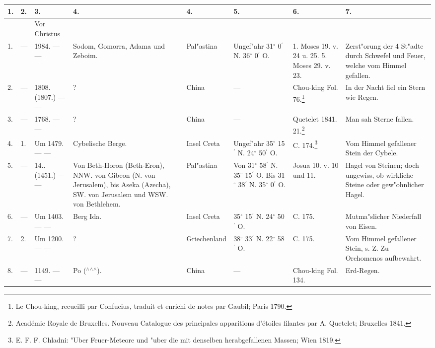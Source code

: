 \documentclass[a4paper, 8pt, oneside, polutonikogreek, german]{article}
\begin{document}
\begin{center}
    \footnotesize
    \begin{longtable}{| p{4mm} | p{2mm} | p{15mm} | p{25mm} | p{16mm} | p{12mm} | p{13mm} | p{20mm} |}
    \hline
        1. & 2. & 3. & 4. & 4. & 5. & 6. & 7. \\ \hline
          &   & Vor Christus &   &   &   &   &   \\ \hline
        1. & --- & 1984. --- --- & Sodom, Gomorra, Adama und Zeboim. & Pal"astina & Ungef"ahr 31$^\circ$ 0$^\prime$ N. 36$^\circ$ 0$^\prime$ O. & 1. Moses 19. v. 24 u. 25. 5. Moses 29. v. 23. & Zerst"orung der 4 St"adte durch Schwefel und Feuer, welche vom Himmel gefallen. \\ \hline
        2. & --- & 1808. (1807.) --- --- & ? & China & --- & Chou-king Fol. 76.\footnote{Le Chou-king, recueilli par Confucius, traduit et enrichi de notes par Gaubil; Paris 1790.} & In der Nacht fiel ein Stern wie Regen. \\ \hline
        3. & --- & 1768. --- --- & ? & China & --- & Quetelet 1841. 21.\footnote{Académie Royale de Bruxelles. Nouveau Catalogue des principales apparitions d'étoiles filantes par A. Quetelet; Bruxelles 1841.} & Man sah Sterne fallen. \\ \hline
        4. & 1. & Um 1479. --- --- & Cybelische Berge. & Insel Creta & Ungef"ahr 35$^\circ$ 15$^\prime$ N. 24$^\circ$ 50$^\prime$ O. & C. 174.\footnote{E. F. F. Chladni: "Uber Feuer-Meteore und "uber die mit denselben herabgefallenen Massen; Wien 1819.} & Vom Himmel gefallener Stein der Cybele. \\ \hline
        5. & --- & 14.. (1451.) --- --- & Von Beth-Horon (Beth-Eron), NNW. von Gibeon (N. von Jerusalem), bis Aseka (Azecha), SW. von Jerusalem und WSW. von Bethlehem. & Pal"astina & Von 31$^\circ$ 58$^\prime$ N. 35$^\circ$ 15$^\prime$ O. Bis 31$^\circ$ 38$^\prime$ N. 35$^\circ$ 0$^\prime$ O. & Josua 10. v. 10 und 11. & Hagel von Steinen; doch ungewiss, ob wirkliche Steine oder gew"ohnlicher Hagel. \\ \hline
        6. & --- & Um 1403. --- --- & Berg Ida. & Insel Creta & 35$^\circ$ 15$^\prime$ N. 24$^\circ$ 50$^\prime$ O. & C. 175. & Mutma"slicher Niederfall von Eisen. \\ \hline
        7. & 2. & Um 1200. --- --- & ? & Griechenland & 38$^\circ$ 33$^\prime$ N. 22$^\circ$ 58$^\prime$ O. & C. 175. & Vom Himmel gefallener Stein, s. Z. Zu Orchomenos aufbewahrt. \\ \hline
        8. & --- & 1149. --- --- & Po ($^\wedge$$^\wedge$$^\wedge$). & China & --- & Chou-king Fol. 134. & Erd-Regen. \\ \hline

\end{longtable}
\end{center}
\end{document}
